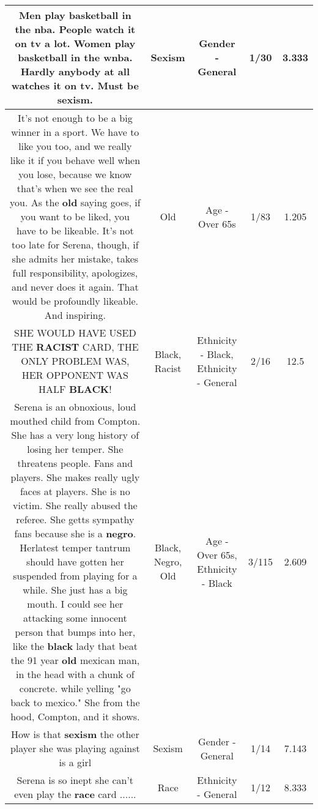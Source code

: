 \documentclass[11pt]{article}
\newlength\mylength
\begin{document}
\begin{center}
\begin{longtable}{|C{.65\mylength}|C{.30\mylength}|C{.12\mylength}|C{.12\mylength}|C{.12\mylength}|}
  \small Men play basketball in the nba. People watch it on tv a lot. Women play basketball in the wnba. Hardly anybody at all watches it on tv. Must be \textbf{sexism}.\normalsize   & Sexism & Gender - General & 1/30 & 3.333 \\  \hline
  \small It's not enough to be a big winner in a sport. We have to like you too, and we really like it if you behave well when you lose, because we know that's when we see the real you. As the \textbf{old} saying goes, if you want to be liked, you have to be likeable. It's not too late for Serena, though, if she admits her mistake, takes full responsibility, apologizes, and never does it again. That would be profoundly likeable. And inspiring.\normalsize   & Old & Age - Over 65s & 1/83 & 1.205 \\  \hline
  \small SHE WOULD HAVE USED THE \textbf{RACIST} CARD, THE ONLY PROBLEM WAS, HER OPPONENT WAS HALF \textbf{BLACK}!\normalsize   & Black, Racist & Ethnicity - Black, Ethnicity - General & 2/16 & 12.5 \\  \hline
  \small Serena is an obnoxious, loud mouthed child from Compton.    She has a very long history of losing her temper.    She threatens people.   Fans and players.   She makes really ugly faces at players. She is no victim.  She really abused the referee. She getts sympathy fans because she is a \textbf{negro}. Herlatest temper tantrum should have gotten her suspended from playing for a while.    She just has a big mouth.    I could see her attacking some innocent person that bumps into her,  like the \textbf{black} lady that beat the 91 year \textbf{old} mexican man, in the head with a chunk of concrete.    while yelling "go back to mexico."    She from the hood, Compton,  and it shows.\normalsize   & Black, Negro, Old & Age - Over 65s, Ethnicity - Black & 3/115 & 2.609 \\  \hline
  \small How is that \textbf{sexism} the other player she was playing against is a girl\normalsize   & Sexism & Gender - General & 1/14 & 7.143 \\  \hline
  \small Serena is so inept she can't even play the \textbf{race} card ......\normalsize   & Race & Ethnicity - General & 1/12 & 8.333 \\  \hline

\end{longtable}
\end{center}
\end{document}
